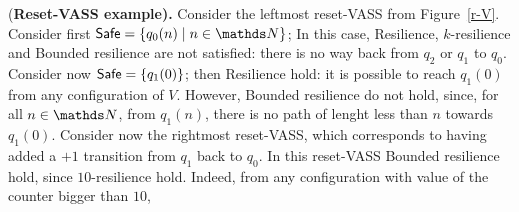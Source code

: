 \begin{example}\label{Example}
{(\bf Reset-VASS example).}
Consider the leftmost reset-VASS from Figure~\ref{r-V}.
Consider first $\Safe = \{q_0(n) \mid n \in \N\}$; In this case,  {Resilience}, { $k$-resilience} and { Bounded resilience} are not satisfied: there is no  way back from $q_2$ or $q_1$ to $q_0$. Consider now $\textsf{Safe} = \{q_1(0)\} $; then { Resilience} hold: it is possible to reach $q_1(0)$ from any configuration of $V$. However, { Bounded resilience} do not hold, since, for all $n\in \N$, from $q_1(n)$, there is no path of lenght less than $n$ towards $q_1(0)$. Consider now the rightmost reset-VASS, which corresponds to having added a $+1$ transition from $q_1$ back to $q_0$. In this reset-VASS { Bounded resilience} hold, since $10$-resilience hold. 
Indeed, from any configuration with value of the counter bigger than $10$, 
\end{example}
